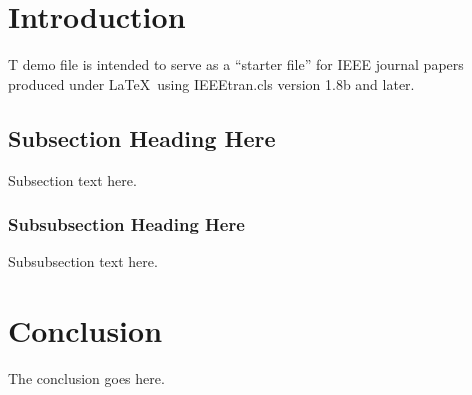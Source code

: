 \documentclass[journal,12pt,onecolumn,draftclsnofoot,]{sty/IEEEtran}
\begin{document}
\IEEEpeerreviewmaketitle
\newpage

\section{Introduction}
T demo file is intended to serve as a ``starter file''
for IEEE journal papers produced under \LaTeX\ using
IEEEtran.cls version 1.8b and later. \cite{natbib}

\subsection{Subsection Heading Here}
Subsection text here.

\subsubsection{Subsubsection Heading Here}
Subsubsection text here.


\section{Conclusion}
The conclusion goes here.

\newpage



\end{document}
